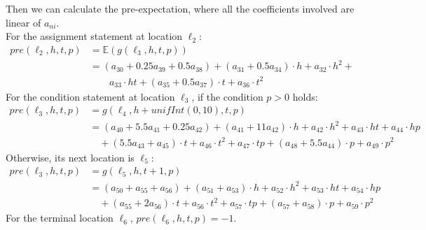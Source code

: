 \documentclass[runningheads]{llncs}
\begin{document}
Then we can calculate the pre-expectation, where all the coefficients involved are linear of $a_{ni}$.\\ For the assignment statement at location $\ell_2$:
\begin{align*}
pre(\ell_2,h,t,p)&=\mathbb{E}(g(\ell_3,h,t,p)) \\
&= (a_{30}+0.25a_{39}+0.5a_{38})+(a_{31}+0.5a_{34})\cdot h+a_{32}\cdot h^{2}+\\&\qquad a_{33}\cdot ht+(a_{35}+0.5a_{37})\cdot t+a_{36}\cdot t^{2}  
\end{align*}
For the condition statement at location $\ell_3$, if the condition $p>0$ holds:
\begin{align*}
pre(\!\ell_3,h,t,p\!)&\!=\!g(\ell_4,h+unifInt(0,10),t,p) \\
&\!=\!(a_{40}\!+\!5.5a_{41}\!+\!0.25a_{42})\!+\!(a_{41}\!+\!11a_{42})\!\cdot\! h\!+\!a_{42}\!\cdot\! h^{2}\!+\!a_{43}\!\cdot\!ht\!+\!a_{44}\!\cdot\! hp\\&\quad +(5.5a_{43}\!+\!a_{45})\!\cdot\! t\!+\! a_{46}\!\cdot\! t^{2}\!+\!a_{47}\!\cdot\! tp +(a_{48}\!+\!5.5a_{44})\!\cdot\! p\!+\!a_{49}\!\cdot\! p^{2} 
\end{align*}
Otherwise, its next location is $\ell_5$:
\begin{align*}
pre(\ell_3,h,t,p)&=g(\ell_5,h,t+1,p) \\
&=(a_{50}\!+\!a_{55}\!+\!a_{56})+(a_{51}\!+\!a_{53})\cdot h +a_{52}\cdot h^{2}+a_{53}\cdot ht+a_{54}\cdot hp\\&\quad +(a_{55}+2a_{56})\cdot t+a_{56}\cdot t^{2}+a_{57}\cdot tp+(a_{57}+a_{58})\cdot p+a_{59}\cdot p^{2}
\end{align*}
For the terminal location $\ell_6$, $pre(\ell_6,h,t,p)=-1$.
\end{document}
